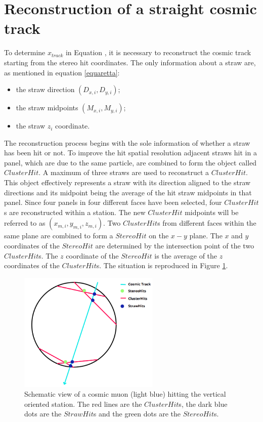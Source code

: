 \section{Reconstruction of a straight cosmic track}\label{reconstruction}
To determine $x_{track}$ in Equation \label{ffffff}, 
it is necessary to reconstruct the cosmic track 
starting from the stereo hit coordinates.
The only information about a straw are, as 
mentioned in equation \ref{equaretta}:
\begin{itemize}
    \item the straw direction $(D_{x,i},D_{y,i})$;
    \item the straw midpoints $(M_{x,i},M_{y,i})$;
    \item the straw $z_i$ coordinate.
\end{itemize} 
The reconstruction process begins 
with the sole information of whether 
a straw has been hit or not.
To improve the hit 
spatial resolution adjacent straws hit 
in a panel, which are
due to the same particle, are combined 
to form the object called $ClusterHit$. 
A maximum of three straws are used to reconstruct a 
$ClusterHit$.
This object effectively represents a 
straw with its direction aligned to the 
straw directions and its midpoint 
being the average of the hit straw 
midpoints in that panel. Since four 
panels in four different faces have been selected,  
four $ClusterHit$s are reconstructed 
within a station. The new $ClusterHit$ 
midpoints will be referred to as 
$(x_{m,i}, y_{m,i}, z_{m,i})$.
Two $ClusterHit$s from different 
faces within the same plane are 
combined to form a $StereoHit$ on 
the $x-y$ plane. 
The $x$ and $y$ coordinates of the 
$StereoHit$ are determined by the 
intersection point of the two 
$ClusterHit$s. The $z$ coordinate of 
the $StereoHit$ is the average of the 
$z$ coordinates of the $ClusterHit$s.
The situation is reproduced in Figure \ref{fig:stco}.
\begin{figure}[!h]
    \centering
    \includegraphics[width =0.6\textwidth]{figures/png/Screenshot_20240810_210144.png}
    \caption[Schematic view of a cosmic muon hitting the vertical oriented station.]{Schematic view of a cosmic muon (light blue) hitting the vertical oriented station. The red lines are the $ClusterHit$s, the dark blue dots 
    are the $StrawHit$s and the green dots are the $StereoHit$s.}
    \label{fig:stco}
\end{figure}
